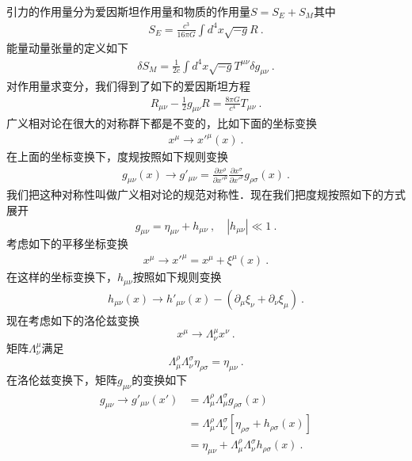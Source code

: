 引力的作用量分为爱因斯坦作用量和物质的作用量$S=S_E+S_M$其中
\begin{align}
S_E = \frac{c^3}{16\pi G} \int d^4 x \sqrt{-g} R~.
\end{align}
能量动量张量的定义如下
\begin{align}
\delta S_M = \frac{1}{2 c} \int d^4 x \sqrt{-g} T^{\mu\nu} \delta g_{\mu\nu} ~. 
\end{align}
对作用量求变分，我们得到了如下的爱因斯坦方程
\begin{align}
R_{\mu\nu} - \frac{1}{2} g_{\mu\nu} R = \frac{8\pi G}{c^4} T_{\mu\nu} ~. 
\end{align}
广义相对论在很大的对称群下都是不变的，比如下面的坐标变换
\begin{align}
x^\mu \rightarrow x'^\mu (x) ~. 
\end{align}
在上面的坐标变换下，度规按照如下规则变换
\begin{align}
g_{\mu\nu} (x) \rightarrow g'_{\mu\nu}  = \frac{\partial x^\rho}{\partial x'^\mu} \frac{\partial x^\sigma}{\partial x'^\nu} g_{\rho\sigma} (x) ~. 
\end{align}
我们把这种对称性叫做广义相对论的规范对称性．现在我们把度规按照如下的方式展开
\begin{equation}\label{Geomet_eq1}
g_{\mu\nu} = \eta_{\mu\nu} + h_{\mu\nu}~, \quad |h_{\mu\nu}| \ll 1 ~. 
\end{equation} 
考虑如下的平移坐标变换
\begin{align}
x^\mu \rightarrow x'^\mu = x^\mu + \xi^\mu (x) ~. 
\end{align}
在这样的坐标变换下，$h_{\mu\nu}$按照如下规则变换
\begin{align}
h_{\mu\nu} (x) \rightarrow h'_{\mu\nu} (x) - (\partial_\mu\xi_\nu+\partial_\nu \xi_\mu) ~.
\end{align}
现在考虑如下的洛伦兹变换
\begin{equation}
x^\mu \rightarrow \Lambda^\mu_\nu x^\nu ~.
\end{equation}
矩阵$\Lambda^\mu_\nu$满足
\begin{equation}
\Lambda^\rho_\mu\Lambda^\sigma_\nu \eta_{\rho\sigma} = \eta_{\mu\nu} ~. 
\end{equation}
在洛伦兹变换下，矩阵$g_{\mu\nu}$的变换如下
\begin{align}\nonumber
g_{\mu\nu} \rightarrow g'_{\mu\nu} (x') & = \Lambda^\rho_\mu \Lambda^\sigma_\mu g_{\rho\sigma} (x) \\\nonumber
& = \Lambda^\rho_\mu \Lambda^\sigma_\nu [\eta_{\rho\sigma} + h_{\rho\sigma}(x)] \\
& = \eta_{\mu\nu} + \Lambda^\rho_\mu \Lambda^\sigma_\nu h_{\rho\sigma} (x) ~.
\end{align}
